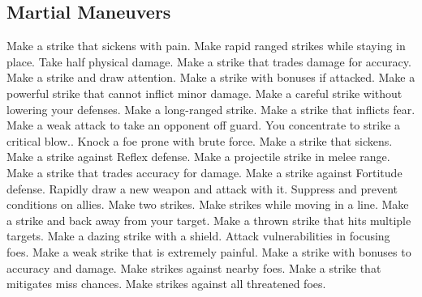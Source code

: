 \subsection{Martial Maneuvers}\label{Martial Maneuvers}
\begin{spelllist}
 Make a strike that sickens with pain.
 Make rapid ranged strikes while staying in place.
 Take half physical damage.
 Make a strike that trades damage for accuracy.
 Make a strike and draw attention.
 Make a strike with bonuses if attacked.
 Make a powerful strike that cannot inflict minor damage.
 Make a careful strike without lowering your defenses.
 Make a long-ranged strike.
 Make a strike that inflicts fear.
 Make a weak attack to take an opponent off guard.
 You concentrate to strike a critical blow..
 Knock a foe prone with brute force.
 Make a strike that sickens.
 Make a strike against Reflex defense.
 Make a projectile strike in melee range.
 Make a strike that trades accuracy for damage.
 Make a strike against Fortitude defense.
 Rapidly draw a new weapon and attack with it.
 Suppress and prevent conditions on allies.
 Make two strikes.
 Make strikes while moving in a line.
 Make a strike and back away from your target.
 Make a thrown strike that hits multiple targets.
 Make a dazing strike with a shield.
 Attack vulnerabilities in focusing foes.
 Make a weak strike that is extremely painful.
 Make a strike with bonuses to accuracy and damage.
 Make strikes against nearby foes.
 Make a strike that mitigates miss chances.
 Make strikes against all threatened foes.
\end{spelllist}



\small
